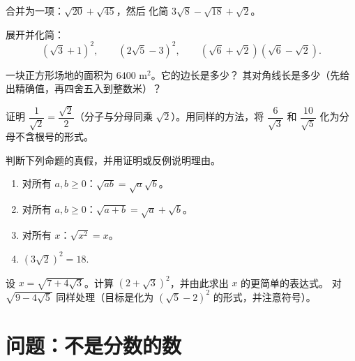 \begin{exercise}[$\star$]\label{exo:g9:sqrt:5}
合并为一项：$\sqrt{20} + \sqrt{45}$，然后
化简 $3\sqrt8 - \sqrt{18} + \sqrt2$。
\end{exercise}

\begin{exercise}[$\star\star$]\label{exo:g9:sqrt:6}
展开并化简：
\[
\left(\sqrt3 + 1\right)^2, \qquad
\left(2\sqrt5 - 3\right)^2, \qquad
\left(\sqrt6 + \sqrt2\right)\left(\sqrt6 - \sqrt2\right).
\]
\end{exercise}

\begin{exercise}[$\star\star$]\label{exo:g9:sqrt:7}
一块正方形场地的面积为 $6400$ m$^2$。它的边长是多少？
其对角线长是多少（先给出精确值，再四舍五入到整数米）？
\end{exercise}

\begin{exercise}[$\star\star$]\label{exo:g9:sqrt:8}
证明 $\dfrac{1}{\sqrt2} = \dfrac{\sqrt2}{2}$（分子与分母同乘
$\sqrt2$）。用同样的方法，将 $\dfrac{6}{\sqrt3}$
和 $\dfrac{10}{\sqrt5}$ 化为分母不含根号的形式。
\end{exercise}

\begin{exercise}[$\star\star$]\label{exo:g9:sqrt:9}
判断下列命题的真假，并用证明或反例说明理由。
\begin{enumerate}
  \item 对所有 $a, b \geq 0$：$\sqrt{ab} = \sqrt a \sqrt b$。
  \item 对所有 $a, b \geq 0$：$\sqrt{a+b} = \sqrt a + \sqrt b$。
  \item 对所有 $x$：$\sqrt{x^2} = x$。
  \item $\left(3\sqrt2\right)^2 = 18$.
\end{enumerate}
\end{exercise}

\begin{exercise}[$\star\star\star$]\label{exo:g9:sqrt:10}
设 $x = \sqrt{7 + 4\sqrt3}$。计算
$\left(2 + \sqrt3\right)^2$，并由此求出 $x$ 的更简单的表达式。
对 $\sqrt{9 - 4\sqrt5}$ 同样处理（目标是化为
$\left(\sqrt5 - 2\right)^2$ 的形式，并注意符号）。
\end{exercise}

\section{问题：不是分数的数}


